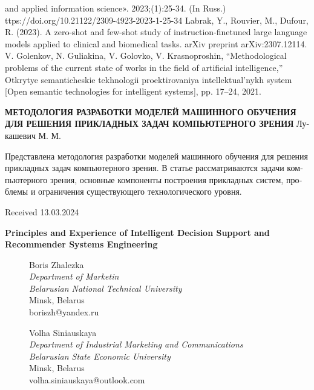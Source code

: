 \documentclass[10pt, a4paper]{article}
\begin{document}
\begin{multicols}{2}
\begin{footnotesize}
\begin{thebibliography}{13}
and applied information science». 2023;(1):25-34. (In Russ.)
ttps://doi.org/10.21122/2309-4923-2023-1-25-34
      Labrak, Y., Rouvier, M., Dufour, R. (2023). A zero-shot and
few-shot study of instruction-finetuned large language models applied to clinical and biomedical tasks. arXiv preprint
arXiv:2307.12114.
      V. Golenkov, N. Guliakina, V. Golovko, V. Krasnoproshin,
“Methodological problems of the current state of works in
the field of artificial intelligence,” Otkrytye semanticheskie
tekhnologii proektirovaniya intellektual’nykh system [Open semantic technologies for intelligent systems], pp. 17–24, 2021.
\end{thebibliography}
\end{footnotesize}
\begin{otherlanguage}{russian}
\begin{center}
\vspace{0.3cm}
\small{\textbf{МЕТОДОЛОГИЯ РАЗРАБОТКИ МОДЕЛЕЙ МАШИННОГО ОБУЧЕНИЯ ДЛЯ РЕШЕНИЯ ПРИКЛАДНЫХ ЗАДАЧ КОМПЬЮТЕРНОГО ЗРЕНИЯ}}
\vspace{0.1cm}
\large{Лукашевич М. М.}
\end{center}

Представлена методология разработки моделей машинного обучения для решения прикладных задач
компьютерного зрения. В статье рассматриваются задачи компьютерного зрения, основные компоненты
построения прикладных систем, проблемы и ограничения существующего технологического уровня.
\end{otherlanguage}
\begin{flushright}
Received 13.03.2024
\end{flushright}
\end{multicols}
\begin{center}
\LARGE{\textbf{Principles and Experience of Intelligent Decision
Support and Recommender Systems Engineering}}
\end{center}
\vspace{0.4cm}
\begin{figure}[H]
\begin{minipage}{7cm}
\centering
    Boris Zhalezka \\
\textit{Department of Marketin \\
Belarusian National Technical University} \\
Minsk, Belarus \\
boriszh@yandex.ru
\end{minipage}
\begin{minipage}{9cm}
\centering
    Volha Siniauskaya \\
\textit{Department of Industrial Marketing and Communications\\
Belarusian State Economic University} \\
Minsk, Belarus \\
volha.siniauskaya@outlook.com \\
\end{minipage}
\end{figure}
\end{document}
